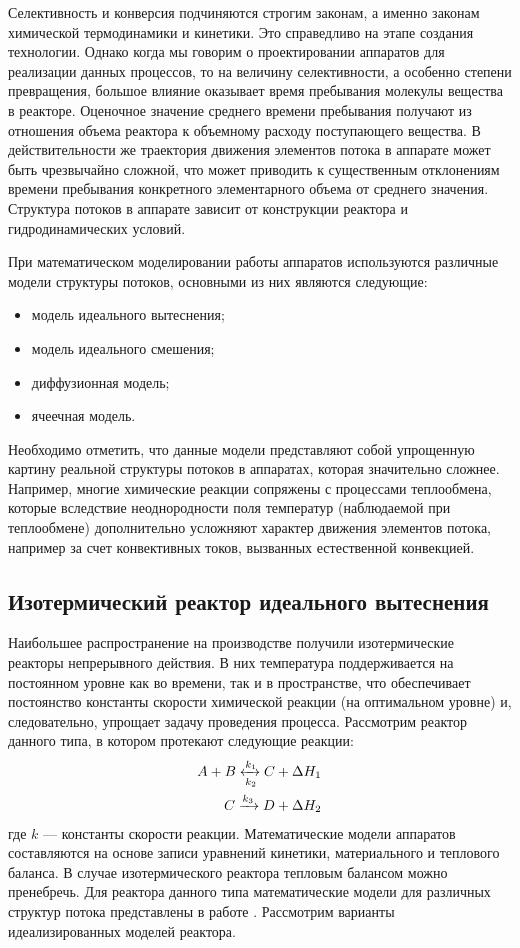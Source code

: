 Селективность и конверсия подчиняются строгим законам, а именно законам химической термодинамики и кинетики. Это справедливо на этапе создания технологии. Однако когда мы говорим о проектировании аппаратов для реализации данных процессов, то на величину селективности, а особенно степени превращения, большое влияние оказывает время пребывания молекулы вещества в реакторе. Оценочное значение среднего времени пребывания получают из отношения объема реактора к объемному расходу поступающего вещества. В действительности же траектория движения элементов потока в аппарате может быть чрезвычайно сложной, что может приводить к существенным отклонениям времени пребывания конкретного элементарного объема от среднего значения. Структура потоков в аппарате зависит от конструкции реактора и гидродинамических условий. 

При математическом моделировании работы аппаратов используются различные модели структуры потоков, основными из них являются следующие: 
\begin{itemize}
\item модель идеального вытеснения;
\item модель идеального смешения;
\item диффузионная модель;
\item ячеечная модель.
\end{itemize}

Необходимо отметить, что данные модели представляют собой упрощенную картину реальной структуры потоков в аппаратах, которая значительно сложнее. Например, многие химические реакции сопряжены с процессами теплообмена, которые вследствие неоднородности поля температур (наблюдаемой при теплообмене) дополнительно усложняют характер движения элементов потока, например за счет конвективных токов, вызванных естественной конвекцией.

\subsection*{Изотермический реактор идеального вытеснения}
Наибольшее распространение на производстве получили изотермические реакторы непрерывного действия. В них температура поддерживается на постоянном уровне как во времени, так и в пространстве, что обеспечивает постоянство константы скорости химической реакции (на оптимальном уровне) и, следовательно, упрощает задачу проведения процесса. Рассмотрим реактор данного типа, в котором протекают следующие реакции:
\begin{equation*} 
\begin{aligned} 
A+B \xleftrightarrow[k_2]{k_1} C + \Delta H_1\\
C \xrightarrow{k_3} D + \Delta H_2
\end{aligned} 
\end{equation*}
где $k$ --- константы скорости реакции.
Математические модели аппаратов составляются на основе записи уравнений кинетики, материального и теплового баланса. В случае изотермического реактора тепловым балансом можно пренебречь. Для реактора данного типа математические модели для различных структур потока представлены в работе \cite{klinov-mm2009}. Рассмотрим варианты идеализированных моделей реактора.

